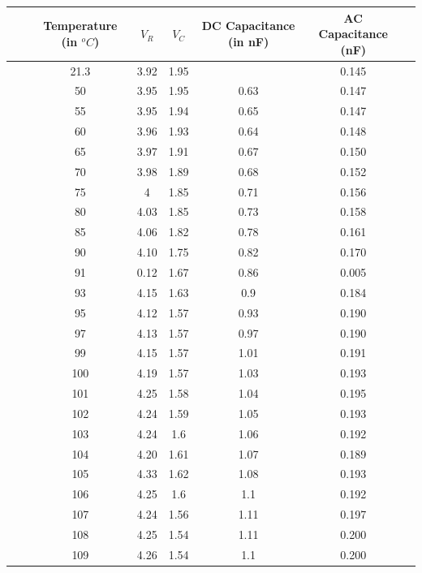 \documentclass[a4paper]{article}
\begin{document}
\begin{table}[htb]
    \centering
    \begin{tabular}{@{}cccccccc@{}}
        \toprule
         &  & Temperature (in $^oC$) & $V_R$ & $V_C$ & DC Capacitance (in nF) & AC Capacitance (nF) &  \\
        \midrule
         &  & 21.3 & 3.92 & 1.95 &  & 0.145 &  \\
         &  & 50 & 3.95 & 1.95 & 0.63 & 0.147 &  \\
         &  & 55 & 3.95 & 1.94 & 0.65 & 0.147 &  \\
         &  & 60 & 3.96 & 1.93 & 0.64 & 0.148 &  \\
         &  & 65 & 3.97 & 1.91 & 0.67 & 0.150 &  \\
         &  & 70 & 3.98 & 1.89 & 0.68 & 0.152 &  \\
         &  & 75 & 4 & 1.85 & 0.71 & 0.156 &  \\
         &  & 80 & 4.03 & 1.85 & 0.73 & 0.158 &  \\
         &  & 85 & 4.06 & 1.82 & 0.78 & 0.161 &  \\
         &  & 90 & 4.10 & 1.75 & 0.82 & 0.170 &  \\
         &  & 91 & 0.12 & 1.67 & 0.86 & 0.005 &  \\
         &  & 93 & 4.15 & 1.63 & 0.9 & 0.184 &  \\
         &  & 95 & 4.12 & 1.57 & 0.93 & 0.190 &  \\
         &  & 97 & 4.13 & 1.57 & 0.97 & 0.190 &  \\
         &  & 99 & 4.15 & 1.57 & 1.01 & 0.191 &  \\
         &  & 100 & 4.19 & 1.57 & 1.03 & 0.193 &  \\
         &  & 101 & 4.25 & 1.58 & 1.04 & 0.195 &  \\
         &  & 102 & 4.24 & 1.59 & 1.05 & 0.193 &  \\
         &  & 103 & 4.24 & 1.6 & 1.06 & 0.192 &  \\
         &  & 104 & 4.20 & 1.61 & 1.07 & 0.189 &  \\
         &  & 105 & 4.33 & 1.62 & 1.08 & 0.193 &  \\
         &  & 106 & 4.25 & 1.6 & 1.1 & 0.192 &  \\
         &  & 107 & 4.24 & 1.56 & 1.11 & 0.197 &  \\
         &  & 108 & 4.25 & 1.54 & 1.11 & 0.200 &  \\
         &  & 109 & 4.26 & 1.54 & 1.1 & 0.200 &  \\

\end{tabular}
\end{table}
\end{document}
